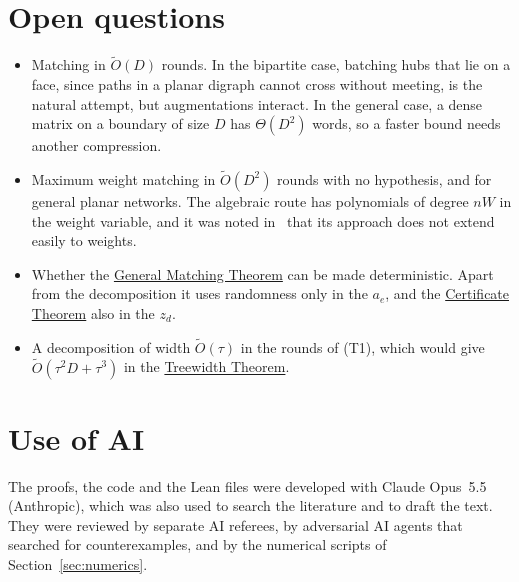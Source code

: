 \documentclass[11pt]{article}
\theoremstyle{definition}
\theoremstyle{remark}
\theoremstyle{plain}
\newcommand{\ThmGen}{\hyperref[thm:gen]{General Matching Theorem}}
\newcommand{\ThmCert}{\hyperref[thm:cert]{Certificate Theorem}}
\newcommand{\ThmTw}{\hyperref[thm:tw]{Treewidth Theorem}}
\newcommand{\Ot}{\tilde O}
\begin{document}
\section{Open questions}\label{sec:open}

\begin{itemize}
\item Matching in $\Ot(D)$ rounds. In the bipartite case, batching hubs that lie on a face, since paths in a planar digraph cannot cross without meeting, is the natural attempt, but augmentations interact. In the general case, a dense matrix on a boundary of size $D$ has $\Theta(D^2)$ words, so a faster bound needs another compression.
\item Maximum weight matching in $\Ot(D^2)$ rounds with no hypothesis, and for general planar networks. The algebraic route has polynomials of degree $nW$ in the weight variable, and it was noted in~\cite{FLPSW18} that its approach does not extend easily to weights.
\item Whether the \ThmGen{} can be made deterministic. Apart from the decomposition it uses randomness only in the $a_e$, and the \ThmCert{} also in the $z_d$.
\item A decomposition of width $\Ot(\tau)$ in the rounds of (T1), which would give $\Ot(\tau^2D+\tau^3)$ in the \ThmTw{}.
\end{itemize}

\section*{Use of AI}

The proofs, the code and the Lean files were developed with Claude Opus~5.5 (Anthropic), which was also used to search the literature and to draft the text. They were reviewed by separate AI referees, by adversarial AI agents that searched for counterexamples, and by the numerical
scripts of Section~\ref{sec:numerics}.
\end{document}
